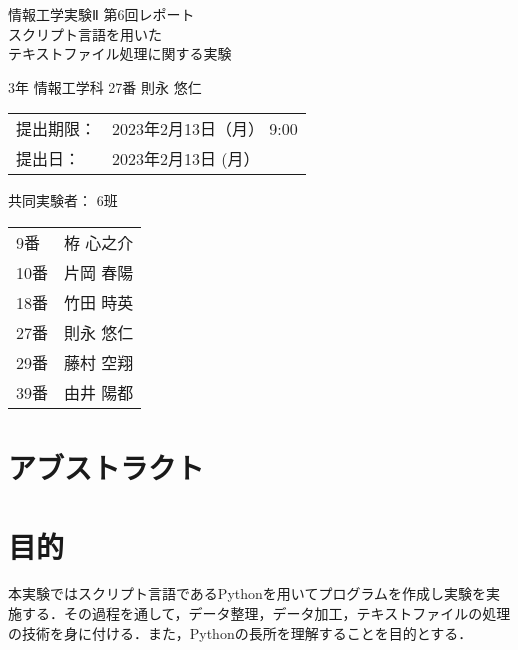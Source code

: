 \documentclass[uplatex,dvipdfmx,12pt]{jsarticle}
\begin{document}
\begin{titlepage}
  \begin{center}
    \begin{huge}
      情報工学実験Ⅱ 第6回レポート \\ \vspace{1em}
      スクリプト言語を用いた\\テキストファイル処理に関する実験
    \end{huge}
  \end{center}
  \vspace{3em}
  \begin{flushright}
    \begin{LARGE}
      \thispagestyle{empty}
      3年 情報工学科 27番  則永 悠仁\\ \vspace{1em}

    \end{LARGE}
  \end{flushright}

  \vspace{6em}

  \begin{Large}
    \begin{tabular}{ll}
      提出期限： & 2023年2月13日（月） 9:00 \\
      提出日：   & 2023年2月13日 (月）
    \end{tabular}
    \vspace{2em}

    共同実験者： 6班

    \vspace{1em}
    \begin{tabular}{ll}
      9番  & 栫 心之介 \\
      10番 & 片岡 春陽 \\
      18番 & 竹田 時英 \\
      27番 & 則永 悠仁 \\
      29番 & 藤村 空翔 \\
      39番 & 由井 陽都 \\
    \end{tabular}
  \end{Large}
\end{titlepage}

\newpage
\section*{アブストラクト}

\newpage
\section{目的}
本実験ではスクリプト言語であるPythonを用いてプログラムを作成し実験を実施する．その過程を通して，データ整理，データ加工，テキストファイルの処理の技術を身に付ける．また，Pythonの長所を理解することを目的とする．
\end{document}
